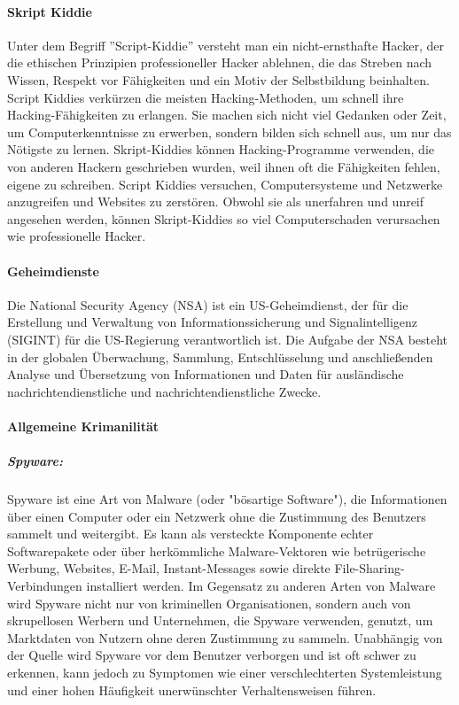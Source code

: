 \paragraph{Skript Kiddie}\mbox{}

Unter dem Begriff ''Script-Kiddie'' versteht man ein nicht-ernsthafte Hacker, der die ethischen Prinzipien professioneller Hacker ablehnen, die das Streben nach Wissen, Respekt vor Fähigkeiten und ein Motiv der Selbstbildung beinhalten. Script Kiddies verkürzen die meisten Hacking-Methoden, um schnell ihre Hacking-Fähigkeiten zu erlangen. Sie machen sich nicht viel Gedanken oder Zeit, um Computerkenntnisse zu erwerben, sondern bilden sich schnell aus, um nur das Nötigste zu lernen. Skript-Kiddies können Hacking-Programme verwenden, die von anderen Hackern geschrieben wurden, weil ihnen oft die Fähigkeiten fehlen, eigene zu schreiben. Script Kiddies versuchen, Computersysteme und Netzwerke anzugreifen und Websites zu zerstören. Obwohl sie als unerfahren und unreif angesehen werden, können Skript-Kiddies so viel Computerschaden verursachen wie professionelle Hacker\cite{scriptkiddie11}.

\paragraph{Geheimdienste}\mbox{}

Die National Security Agency (NSA) ist ein US-Geheimdienst, der für die Erstellung und Verwaltung von Informationssicherung und Signalintelligenz (SIGINT) für die US-Regierung verantwortlich ist. Die Aufgabe der NSA besteht in der globalen Überwachung, Sammlung, Entschlüsselung und anschließenden Analyse und Übersetzung von Informationen und Daten für ausländische nachrichtendienstliche und nachrichtendienstliche Zwecke\cite{nsa14}.

\paragraph{Allgemeine Krimanilität}\mbox{}

\subparagraph{Spyware: }

Spyware ist eine Art von Malware (oder "bösartige Software"), die Informationen über einen Computer oder ein Netzwerk ohne die Zustimmung des Benutzers sammelt und weitergibt. Es kann als versteckte Komponente echter Softwarepakete oder über herkömmliche Malware-Vektoren wie betrügerische Werbung, Websites, E-Mail, Instant-Messages sowie direkte File-Sharing-Verbindungen installiert werden. Im Gegensatz zu anderen Arten von Malware wird Spyware nicht nur von kriminellen Organisationen, sondern auch von skrupellosen Werbern und Unternehmen, die Spyware verwenden, genutzt, um Marktdaten von Nutzern ohne deren Zustimmung zu sammeln. Unabhängig von der Quelle wird Spyware vor dem Benutzer verborgen und ist oft schwer zu erkennen, kann jedoch zu Symptomen wie einer verschlechterten Systemleistung und einer hohen Häufigkeit unerwünschter Verhaltensweisen führen\cite{spy12}.

